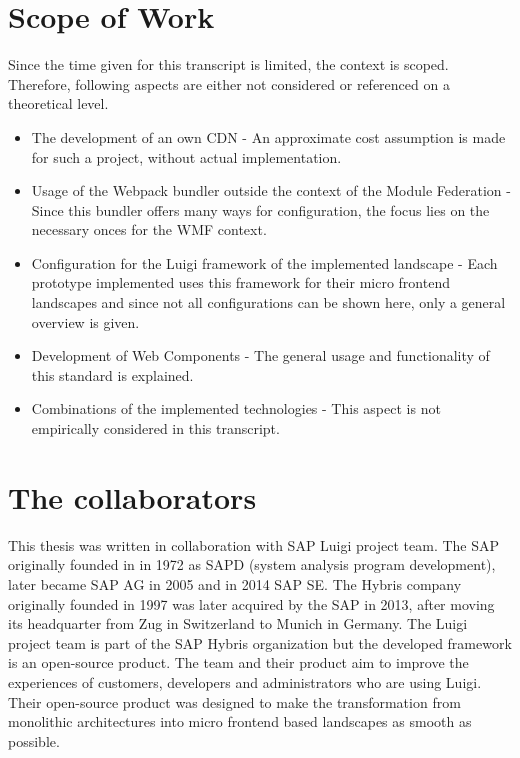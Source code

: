 \section{Scope of Work}

Since the time given for this transcript is limited, the context is scoped. Therefore, following aspects are either not considered or referenced on a theoretical level.

\begin{itemize}
	\item The development of an own CDN - An approximate cost assumption is made for such a project, without actual implementation.
	\item Usage of the Webpack bundler outside the context of the Module Federation - Since this bundler offers many ways for configuration, the focus lies on the necessary onces for the WMF context.
	\item Configuration for the Luigi framework of the implemented landscape - Each prototype implemented uses this framework for their micro frontend landscapes and since not all configurations can be shown here, only a general overview is given.
	\item Development of Web Components - The general usage and functionality of this standard is explained.
	\item Combinations of the implemented technologies - This aspect is not empirically considered in this transcript.
\end{itemize}

\section{The collaborators}

This thesis was written in collaboration with SAP Luigi project team. The SAP originally founded in in 1972 as SAPD (system analysis program development), later became SAP AG in 2005 and in 2014 SAP SE. The Hybris company originally founded in 1997 was later acquired by the SAP in 2013, after moving its headquarter from Zug in Switzerland to Munich in Germany.\cite{sap_history} The Luigi project team is part of the SAP Hybris organization but the developed framework is an open-source product. 
The team and their product aim to improve the experiences of customers, developers and administrators who are using Luigi. Their open-source product was designed to make the transformation from monolithic architectures into micro frontend based landscapes as smooth as possible. 

 
